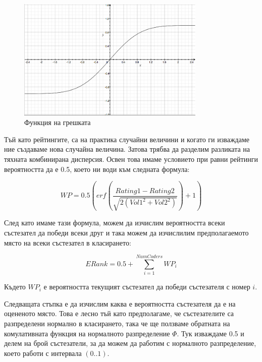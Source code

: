 \documentclass[a4paper,12pt]{article}
\begin{document}
  \begin{figure}
    \begin{center}
      \includegraphics[width=0.8\textwidth]{error_function.png}
    \end{center}
    \caption{Функция на грешката}
    \label{error_function}
  \end{figure}
  
  Тъй като рейтингите, са на практика случайни величини и когато ги изваждаме ние създаваме нова случайна величина. Затова трябва да разделим разликата на тяхната комбинирана дисперсия. Освен това имаме условието при равни рейтинги вероятността да е 0.5, което ни води към следната формула:
  
  \begin{equation}
    WP=0.5\left(erf\left(\frac{Rating1 - Rating2}{\sqrt{2(Vol1^2+Vol2^2)}}\right) + 1\right)
  \end{equation}
  
  След като имаме тази формула, можем да изчислим вероятността всеки състезател да победи всеки друг и така можем да изчислилим предполагаемото място на всеки състезател в класирането:
  
  \begin{equation}
    ERank=0.5+\sum\limits_{i=1}^{NumCoders} WP_i
  \end{equation}
  
  Където \(WP_i\) е вероятността текущият състезател да победи състезателя с номер \(i\).
  
  Следващата стъпка е да изчислим каква е вероятността състезателя да е на оцененото място. Това е лесно тъй като предполагаме, че състезателите са разпределени нормално в класирането, така че ще ползваме обратната на комулативната функция на нормалното разпределение \(\Phi\). Тук изваждаме 0.5 и делем на брой състезатели, за да можем да работим с нормалното разпределение, което работи с интервала \((0..1)\).
  
\end{document}
